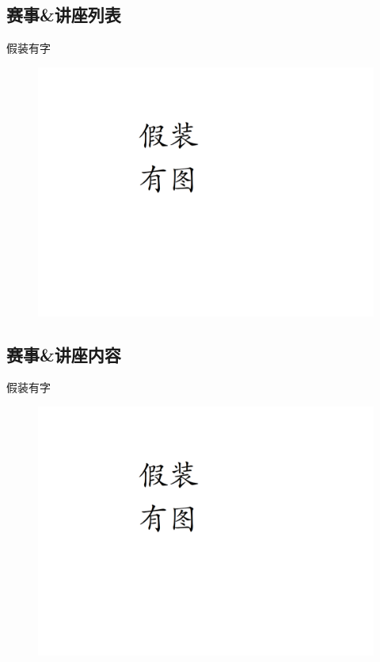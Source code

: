 \documentclass[UTF8]{ctexart}
\begin{document}
\newpage
\subsection{赛事\&讲座列表}
假装有字
\begin{figure}[h]
    \centering
    \includegraphics[width=\textwidth]{manual_images//temp.png}
\end{figure}

\newpage
\subsection{赛事\&讲座内容}
假装有字
\begin{figure}[h]
    \centering
    \includegraphics[width=\textwidth]{manual_images//temp.png}
\end{figure}
\end{document}
